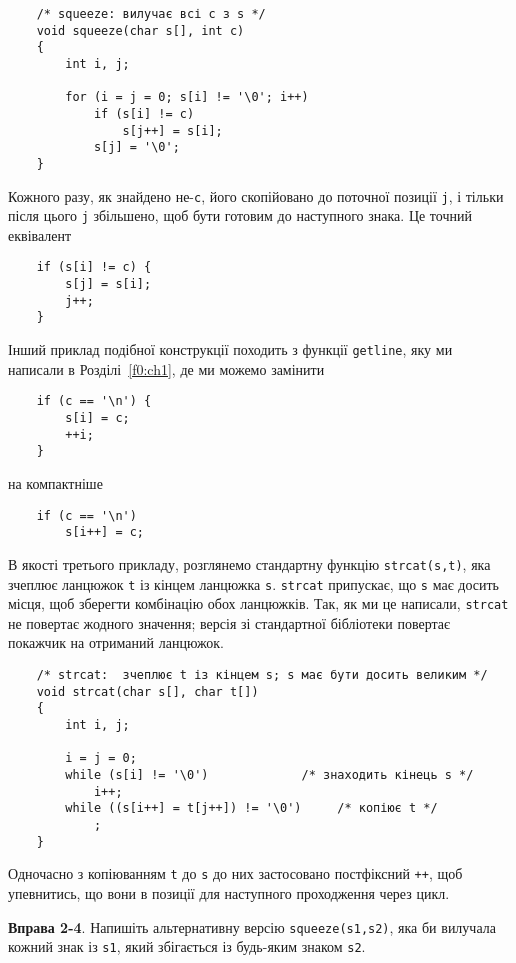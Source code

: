\documentclass[a4paper,12pt]{book}
\begin{document}
  \begin{verbatim}
    /* squeeze: вилучає всі c з s */
    void squeeze(char s[], int c)
    {
        int i, j;

        for (i = j = 0; s[i] != '\0'; i++)
            if (s[i] != c)
                s[j++] = s[i];
            s[j] = '\0';
    }
  \end{verbatim}

  Кожного разу, як знайдено не-\texttt{c}, його скопійовано до поточної позиції \texttt{j},
  і тільки після цього \texttt{j} збільшено, щоб бути готовим до наступного знака. Це
  точний еквівалент
  \begin{verbatim}
    if (s[i] != c) {
        s[j] = s[i];
        j++;
    }
  \end{verbatim}

  Інший приклад подібної конструкції походить з функції \texttt{getline}, яку ми написали
  в Розділі~\ref{f0:ch1}, де ми можемо замінити
  \begin{verbatim}
    if (c == '\n') {
        s[i] = c;
        ++i;
    }
  \end{verbatim}
  на компактніше
  \begin{verbatim}
    if (c == '\n')
        s[i++] = c;
  \end{verbatim}

  В якості третього прикладу, розглянемо стандартну функцію \texttt{strcat(s,t)}, яка
  зчеплює ланцюжок \texttt{t} із кінцем ланцюжка \texttt{s}. \texttt{strcat} припускає, що
  \texttt{s} має досить місця, щоб зберегти комбінацію обох ланцюжків. Так, як ми це
  написали, \texttt{strcat} не повертає жодного значення; версія зі стандартної бібліотеки
  повертає покажчик на отриманий ланцюжок.

  \begin{verbatim}
    /* strcat:  зчеплює t із кінцем s; s має бути досить великим */
    void strcat(char s[], char t[])
    {
        int i, j;

        i = j = 0;
        while (s[i] != '\0')             /* знаходить кінець s */
            i++;
        while ((s[i++] = t[j++]) != '\0')     /* копіює t */
            ;
    }
  \end{verbatim}

  Одночасно з копіюванням \texttt{t} до \texttt{s} до них застосовано постфіксний
  \texttt{++}, щоб упевнитись, що вони в позиції для наступного проходження через цикл.

  \textbf{Вправа 2-4}. Напишіть альтернативну версію \texttt{squeeze(s1,s2)}, яка би
  вилучала кожний знак із \texttt{s1}, який збігається із будь-яким знаком \texttt{s2}.
\end{document}
